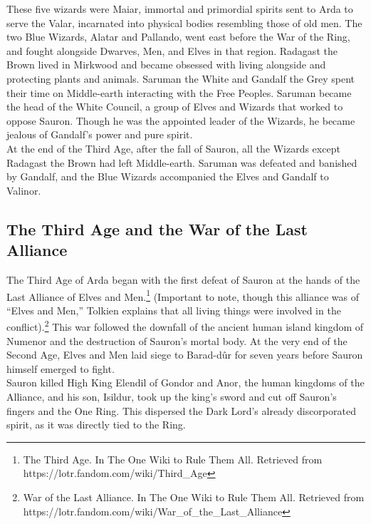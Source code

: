 \documentclass[10pt, letterpaper]{article}
\begin{document}
\noindent These five wizards were Maiar, immortal and primordial spirits sent to Arda to serve the Valar, incarnated into physical bodies resembling those of old men. The two Blue Wizards, Alatar and Pallando, went east before the War of the Ring, and fought alongside Dwarves, Men, and Elves in that region. Radagast the Brown lived in Mirkwood and became obsessed with living alongside and protecting plants and animals. Saruman the White and Gandalf the Grey spent their time on Middle-earth interacting with the Free Peoples. Saruman became the head of the White Council, a group of Elves and Wizards that worked to oppose Sauron. Though he was the appointed leader of the Wizards, he became jealous of Gandalf’s power and pure spirit.\\

\noindent At the end of the Third Age, after the fall of Sauron, all the Wizards except Radagast the Brown had left Middle-earth. Saruman was defeated and banished by Gandalf, and the Blue Wizards accompanied the Elves and Gandalf to Valinor. \\

\subsection{The Third Age and the War of the Last Alliance}

\noindent The Third Age of Arda began with the first defeat of Sauron at the hands of the Last Alliance of Elves and Men.\footnote{The Third Age. In The One Wiki to Rule Them All. Retrieved from https://lotr.fandom.com/wiki/Third\_Age} (Important to note, though this alliance was of “Elves and Men,” Tolkien explains that all living things were involved in the conflict).\footnote{War of the Last Alliance. In The One Wiki to Rule Them All. Retrieved from https://lotr.fandom.com/wiki/War\_of\_the\_Last\_Alliance } This war followed the downfall of the ancient human island kingdom of Numenor and the destruction of Sauron’s mortal body. At the very end of the Second Age, Elves and Men laid siege to Barad-dûr for seven years before Sauron himself emerged to fight. \\

\noindent Sauron killed High King Elendil of Gondor and Anor, the human kingdoms of the Alliance, and his son, Isildur, took up the king’s sword and cut off Sauron’s fingers and the One Ring. This dispersed the Dark Lord’s already discorporated spirit, as it was directly tied to the Ring. \\
\end{document}
